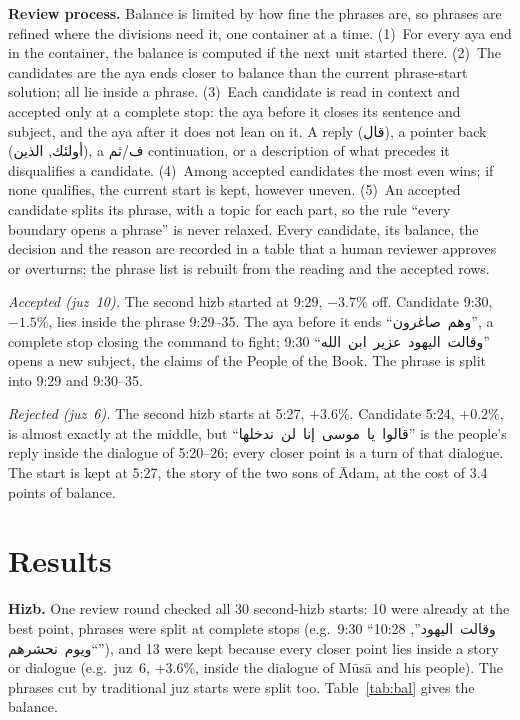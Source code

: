\documentclass[conference]{IEEEtran}
\newcommand{\ar}[1]{\mbox{\textarabic{#1}}}
\begin{document}
\textbf{Review process.}\label{sec:review} Balance is limited by how fine the phrases are, so
phrases are refined where the divisions need it, one container at a time. (1)~For every aya end
in the container, the balance is computed if the next unit started there. (2)~The candidates are
the aya ends closer to balance than the current phrase-start solution; all lie inside a phrase.
(3)~Each candidate is read in context and accepted only at a complete stop: the aya before it
closes its sentence and subject, and the aya after it does not lean on it. A reply (\ar{قال}),
a pointer back (\ar{أولئك}, \ar{الذين}), a \ar{ف}/\ar{ثم} continuation, or a description of what
precedes it disqualifies a candidate. (4)~Among accepted candidates the most even wins; if none
qualifies, the current start is kept, however uneven. (5)~An accepted candidate splits its phrase,
with a topic for each part, so the rule ``every boundary opens a phrase'' is never relaxed.
Every candidate, its balance, the decision and the reason are recorded in a table that a human
reviewer approves or overturns; the phrase list is rebuilt from the reading and the accepted rows.

\emph{Accepted (juz~10).} The second hizb started at 9:29, $-3.7\%$ off. Candidate 9:30, $-1.5\%$,
lies inside the phrase 9:29--35. The aya before it ends ``\ar{وهم صاغرون}'', a complete stop
closing the command to fight; 9:30 ``\ar{وقالت اليهود عزير ابن الله}'' opens a new subject, the
claims of the People of the Book. The phrase is split into 9:29 and 9:30--35.

\emph{Rejected (juz~6).} The second hizb starts at 5:27, $+3.6\%$. Candidate 5:24, $+0.2\%$, is
almost exactly at the middle, but ``\ar{قالوا يا موسى إنا لن ندخلها}'' is the people's reply
inside the dialogue of 5:20--26; every closer point is a turn of that dialogue. The start is kept
at 5:27, the story of the two sons of Ādam, at the cost of 3.4 points of balance.

\section{Results}
\textbf{Hizb.} One review round checked all 30 second-hizb starts: 10 were already at the best
point, \HizbSplits{} phrases were split at complete stops (e.g.\ 9:30 ``\ar{وقالت اليهود}'',
10:28 ``\ar{ويوم نحشرهم}''), and 13 were kept because every closer point lies inside a story or
dialogue (e.g.\ juz~6, +3.6\%, inside the dialogue of Mūsā and his people). The \JuzSplits{}
phrases cut by traditional juz starts were split too. Table~\ref{tab:bal} gives the balance.
\end{document}

